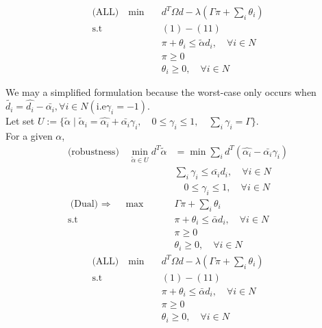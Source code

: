 \documentclass[11pt]{article}
\begin{document}
	
	\begin{align*}
	\text{(ALL)} \quad \min \quad & d^T\Omega d  -  \lambda (\Gamma \pi + \sum_{i} \theta_i  ) \\
	\text{s.t } \quad & (1) - (11)\\
	&\pi + \theta_i \leq   \tilde{\alpha} d_i, \quad \forall i \in N \\
	&\pi \geq 0 \\
	& \theta_i \geq 0, \quad \forall i \in N 
	\end{align*}
	
	We may a simplified formulation because the worst-case only occurs when $\tilde{d_i} =\hat{d_i} - \bar{\alpha_i}, \forall i \in N (\text{i.e} \gamma_i = -1)$. \\[5mm]
    Let set $U := \{ \tilde \alpha  \mid \tilde \alpha_i = \hat{\alpha_i} + \bar{\alpha_i}\gamma_i , \quad 0 \leq \gamma_i\leq 1 , \quad \sum_{i} \gamma_i = \Gamma \}$.\\[5mm]
	For a given $\alpha$,
	\begin{align*}
	\text{(robustness)} 
	\text{} \quad \min_{\tilde \alpha \in U } d^T \tilde{\alpha} &= \min \sum_{i} d^T (\hat{\alpha_i} - \bar{\alpha_i}\gamma_i ) \\
	& \sum_{i} \gamma_i \leq \bar{\alpha_i} d_i , \quad \forall i \in N\\
	& \quad 0 \leq \gamma_i\leq 1 , \quad \forall i \in N\\
	\text{(Dual) $\Rightarrow$} \quad \max\quad & \Gamma  \pi + \sum_{i} \theta_i  \\
	\text{s.t} \quad & \pi + \theta_i \leq   \bar{\alpha} d_i, \quad \forall i \in N \\
	& \pi \geq 0 \quad \\
	&  \theta_i \geq 0, \quad \forall i \in N 
	\end{align*}
	\begin{align*}
	\text{(ALL)} \quad \min \quad & d^T\Omega d  -  \lambda (\Gamma \pi + \sum_{i} \theta_i  ) \\
	\text{s.t } \quad & (1) - (11)\\
	&\pi + \theta_i \leq   \bar{\alpha} d_i, \quad \forall i \in N \\
	&\pi \geq 0 \\
	& \theta_i \geq 0, \quad \forall i \in N 
	\end{align*}
\end{document}
